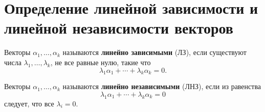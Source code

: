 \section{Определение линейной зависимости и линейной независимости векторов}

\begin{definition}
Векторы $\alpha_1, \ldots, \alpha_k$ называются \textbf{линейно зависимыми} (ЛЗ), если существуют числа $\lambda_1, \ldots, \lambda_k$, не все равные нулю, такие что
\[
\lambda_1 \alpha_1 + \cdots + \lambda_k \alpha_k = 0.
\]
\end{definition}

\begin{definition}
Векторы $\alpha_1, \ldots, \alpha_k$ называются \textbf{линейно независимыми} (ЛНЗ), если из равенства
\[
\lambda_1 \alpha_1 + \cdots + \lambda_k \alpha_k = 0
\]
следует, что все $\lambda_i = 0$.
\end{definition}
